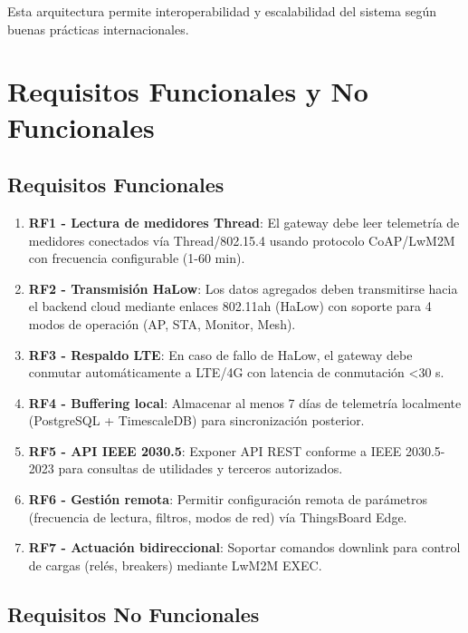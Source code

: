 Esta arquitectura permite interoperabilidad y escalabilidad del sistema según buenas prácticas internacionales.

\section{Requisitos Funcionales y No Funcionales}

\subsection{Requisitos Funcionales}

\begin{enumerate}
    \item \textbf{RF1 - Lectura de medidores Thread}: El gateway debe leer telemetría de medidores conectados vía Thread/802.15.4 usando protocolo CoAP/LwM2M con frecuencia configurable (1-60 min).
    \item \textbf{RF2 - Transmisión HaLow}: Los datos agregados deben transmitirse hacia el backend cloud mediante enlaces 802.11ah (HaLow) con soporte para 4 modos de operación (AP, STA, Monitor, Mesh).
    \item \textbf{RF3 - Respaldo LTE}: En caso de fallo de HaLow, el gateway debe conmutar automáticamente a LTE/4G con latencia de conmutación <30 s.
    \item \textbf{RF4 - Buffering local}: Almacenar al menos 7 días de telemetría localmente (PostgreSQL + TimescaleDB) para sincronización posterior.
    \item \textbf{RF5 - API IEEE 2030.5}: Exponer API REST conforme a IEEE 2030.5-2023 para consultas de utilidades y terceros autorizados.
    \item \textbf{RF6 - Gestión remota}: Permitir configuración remota de parámetros (frecuencia de lectura, filtros, modos de red) vía ThingsBoard Edge.
    \item \textbf{RF7 - Actuación bidireccional}: Soportar comandos downlink para control de cargas (relés, breakers) mediante LwM2M EXEC.
\end{enumerate}

\subsection{Requisitos No Funcionales}


